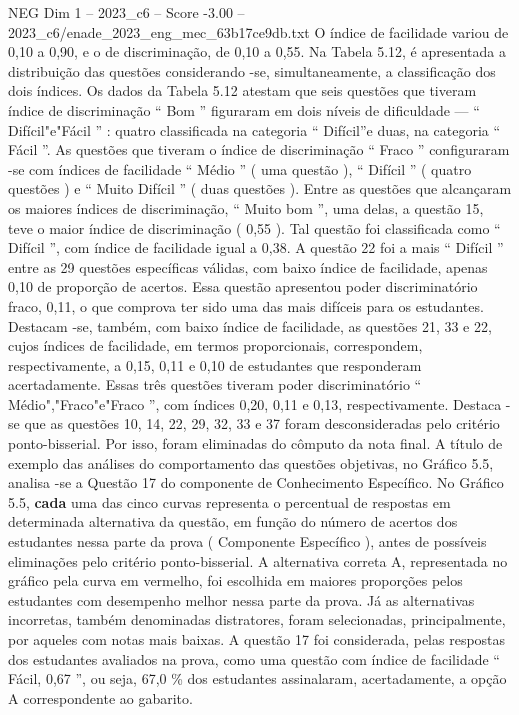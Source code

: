 \begin{textsample}{NEG Dim 1 – 2023\_c6 – Score -3.00 – 2023\_c6/enade\_2023\_eng\_mec\_63b17ce9db.txt}
O índice de facilidade variou de 0,10 a 0,90, e o de discriminação, de 0,10 a 0,55.
Na Tabela 5.12, é apresentada a distribuição das questões considerando -se, simultaneamente, a classificação dos dois índices.
Os dados da Tabela 5.12 atestam que seis questões que tiveram índice de discriminação “ Bom ” figuraram em dois níveis de dificuldade — “ Difícil"e"Fácil ” : quatro classificada na categoria “ Difícil”e duas, na categoria “ Fácil ”.
As questões que tiveram o índice de discriminação “ Fraco ” configuraram -se com índices de facilidade “ Médio ” ( uma questão ), “ Difícil ” ( quatro questões ) e “ Muito Difícil ” ( duas questões ).
Entre as questões que alcançaram os maiores índices de discriminação, “ Muito bom ”, uma delas, a questão 15, teve o maior índice de discriminação ( 0,55 ).
Tal questão foi classificada como “ Difícil ”, com índice de facilidade igual a 0,38.
A questão 22 foi a mais “ Difícil ” entre as 29 questões específicas válidas, com baixo índice de facilidade, apenas 0,10 de proporção de acertos.
Essa questão apresentou poder discriminatório fraco, 0,11, o que comprova ter sido uma das mais difíceis para os estudantes.
Destacam -se, também, com baixo índice de facilidade, as questões 21, 33 e 22, cujos índices de facilidade, em termos proporcionais, correspondem, respectivamente, a 0,15, 0,11 e 0,10 de estudantes que responderam acertadamente.
Essas três questões tiveram poder discriminatório “ Médio","Fraco"e"Fraco ”, com índices 0,20, 0,11 e 0,13, respectivamente.
Destaca -se que as questões 10, 14, 22, 29, 32, 33 e 37 foram desconsideradas pelo critério ponto-bisserial.
Por isso, foram eliminadas do cômputo da nota final.
A título de exemplo das análises do comportamento das questões objetivas, no Gráfico 5.5, analisa -se a Questão 17 do componente de Conhecimento Específico.
No Gráfico 5.5, \textbf{cada} uma das cinco curvas representa o percentual de respostas em determinada alternativa da questão, em função do número de acertos dos estudantes nessa parte da prova ( Componente Específico ), antes de possíveis eliminações pelo critério ponto-bisserial.
A alternativa correta A, representada no gráfico pela curva em vermelho, foi escolhida em maiores proporções pelos estudantes com desempenho melhor nessa parte da prova.
Já as alternativas incorretas, também denominadas distratores, foram selecionadas, principalmente, por aqueles com notas mais baixas.
A questão 17 foi considerada, pelas respostas dos estudantes avaliados na prova, como uma questão com índice de facilidade “ Fácil, 0,67 ”, ou seja, 67,0 \% dos estudantes assinalaram, acertadamente, a opção A correspondente ao gabarito.

\end{textsample}

